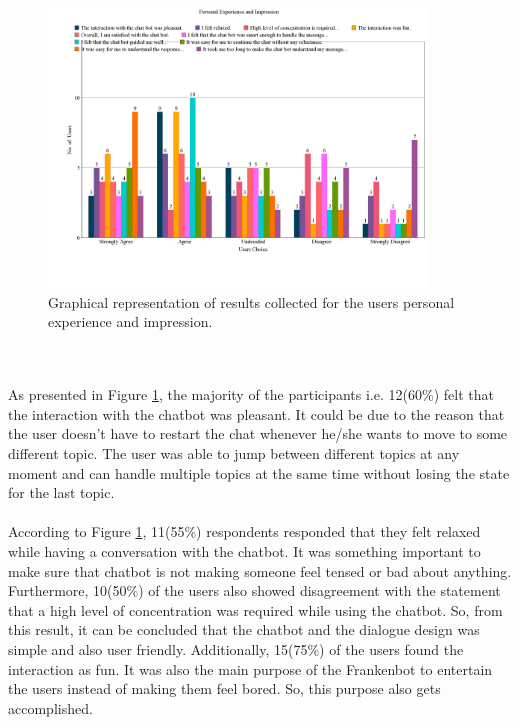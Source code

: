 \begin{figure}[!h]
    \centering
    \includegraphics[width=0.9\textwidth]{img/Personal_Experience_and_Impression_Updated.png}
    \caption{Graphical representation of results collected for the users personal experience and impression.}
    \label{fig:persExpandImp}
\end{figure}
\\~\\
As presented in Figure \ref{fig:persExpandImp}, the majority of the participants i.e. 12(60\%) felt that the interaction with the chatbot was pleasant. It could be due to the reason that the user doesn't have to restart the chat whenever he/she wants to move to some different topic. The user was able to jump between different topics at any moment and can handle multiple topics at the same time without losing the state for the last topic. 
\\~\\
According to Figure \ref{fig:persExpandImp}, 11(55\%) respondents responded that they felt relaxed while having a conversation with the chatbot. It was something important to make sure that chatbot is not making someone feel tensed or bad about anything. Furthermore, 10(50\%) of the users also showed disagreement with the statement that a high level of concentration was required while using the chatbot. So, from this result, it can be concluded that the chatbot and the dialogue design was simple and also user friendly. Additionally, 15(75\%) of the users found the interaction as fun. It was also the main purpose of the Frankenbot to entertain the users instead of making them feel bored. So, this purpose also gets accomplished. 
\\~\\
